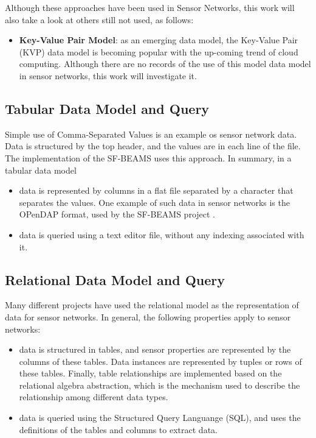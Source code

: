 Although these approaches have been used in Sensor Networks, this work will
also take a look at others still not used, as follows:

\begin{itemize}
  \item \textbf{Key-Value Pair Model}: as an emerging data model, the Key-Value
  Pair (KVP) \cite{db-kvp} data model is becoming popular with the up-coming
  trend of cloud computing. Although there are no records of the use of this
  model data model in sensor networks, this work will investigate it.
\end{itemize}

\subsection{Tabular Data Model and Query}

Simple use of Comma-Separated Values is an example os sensor network data. Data
is structured by the top header, and the values are in each line of the file.
The implementation of the SF-BEAMS \cite{sfbeams2006} uses this approach. In
summary, in a tabular data model

\begin{itemize}
  \item data is represented by columns in a flat file separated by a character
  that separates the values. One example of such data in sensor networks is the
  OPenDAP \cite{opendap} format, used by the SF-BEAMS project
  \cite{sfbeams2006}.
  \item data is queried using a text editor file, without any indexing
  associated with it. 
\end{itemize}

\subsection{Relational Data Model and Query}

Many different projects have used the relational model \cite{relational-model}
as the representation of data for sensor networks. In general, the following
properties apply to sensor networks:

\begin{itemize}
  \item data is structured in tables, and sensor properties are represented 
 by the columns of these tables. Data instances are represented by tuples or
 rows of these tables. Finally, table relationships are implemented based
 on the relational algebra abstraction, which is the mechanism used to 
describe the relationship among different data types.
  \item data is queried using the Structured Query Languange (SQL), and uses
  the definitions of the tables and columns to extract data.
\end{itemize}

